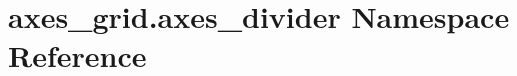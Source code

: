 \hypertarget{namespaceaxes__grid_1_1axes__divider}{}\section{axes\+\_\+grid.\+axes\+\_\+divider Namespace Reference}
\label{namespaceaxes__grid_1_1axes__divider}
